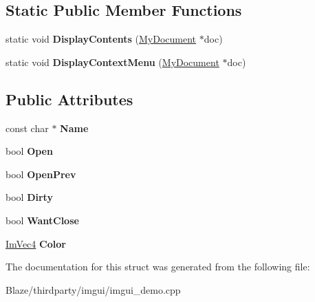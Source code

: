 \subsection*{Static Public Member Functions}
\begin{DoxyCompactItemize}
\item 
\mbox{\label{structMyDocument_aa51e0b8e6c95b7109a507603599c05d9}} 
static void {\bfseries Display\+Contents} (\hyperlink{structMyDocument}{My\+Document} $\ast$doc)
\item 
\mbox{\label{structMyDocument_ae9e8d83c14b75c307447e3f410e432ec}} 
static void {\bfseries Display\+Context\+Menu} (\hyperlink{structMyDocument}{My\+Document} $\ast$doc)
\end{DoxyCompactItemize}
\subsection*{Public Attributes}
\begin{DoxyCompactItemize}
\item 
\mbox{\label{structMyDocument_a2fedfb9783c251ae4d200c686e9e3180}} 
const char $\ast$ {\bfseries Name}
\item 
\mbox{\label{structMyDocument_abe5ed4d7f257d5a2fe5cf2a1844b22f9}} 
bool {\bfseries Open}
\item 
\mbox{\label{structMyDocument_a1537678ceac13d60a512bf63e2668745}} 
bool {\bfseries Open\+Prev}
\item 
\mbox{\label{structMyDocument_a8d239384f0e6d16da96b783a4f14eb55}} 
bool {\bfseries Dirty}
\item 
\mbox{\label{structMyDocument_a14044f55bd2f6c6dd43b60150b1de6eb}} 
bool {\bfseries Want\+Close}
\item 
\mbox{\label{structMyDocument_a38d0b4dc1d4cd036ab39031fbd6d57cc}} 
\hyperlink{structImVec4}{Im\+Vec4} {\bfseries Color}
\end{DoxyCompactItemize}


The documentation for this struct was generated from the following file\+:\begin{DoxyCompactItemize}
\item 
Blaze/thirdparty/imgui/imgui\+\_\+demo.\+cpp\end{DoxyCompactItemize}
